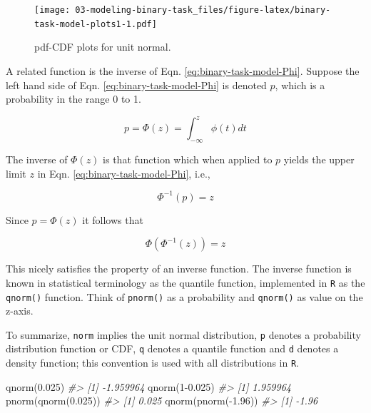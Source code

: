 \documentclass[
]{book}
\newenvironment{Shaded}{\begin{snugshade}}{\end{snugshade}}
\newcommand{\CommentTok}[1]{\textcolor[rgb]{0.56,0.35,0.01}{\textit{#1}}}
\newcommand{\DecValTok}[1]{\textcolor[rgb]{0.00,0.00,0.81}{#1}}
\newcommand{\FloatTok}[1]{\textcolor[rgb]{0.00,0.00,0.81}{#1}}
\newcommand{\FunctionTok}[1]{\textcolor[rgb]{0.00,0.00,0.00}{#1}}
\newcommand{\NormalTok}[1]{#1}
\newcommand{\SpecialCharTok}[1]{\textcolor[rgb]{0.00,0.00,0.00}{#1}}
\begin{document}
\begin{figure}
\centering
\texttt{[image: 03-modeling-binary-task\_files/figure-latex/binary-task-model-plots1-1.pdf]}
\caption{\label{fig:binary-task-model-plots1}pdf-CDF plots for unit normal.}
\end{figure}

A related function is the inverse of Eqn. \eqref{eq:binary-task-model-Phi}. Suppose the left hand side of Eqn. \eqref{eq:binary-task-model-Phi} is denoted \(p\), which is a probability in the range 0 to 1.

\begin{equation} 
p=\Phi\left ( z \right )=\int_{-\infty }^{z}\phi(t)dt
\label{eq:binary-task-model-Phi2}
\end{equation}

The inverse of \(\Phi(z)\) is that function which when applied to \(p\) yields the upper limit \(z\) in Eqn. \eqref{eq:binary-task-model-Phi}, i.e.,

\begin{equation} 
\Phi^{-1}(p) = z
\label{eq:binary-task-model-PhiInvDef}
\end{equation}

Since \(p=\Phi(z)\) it follows that

\begin{equation} 
\Phi(\Phi^{-1}(z))=z
\label{eq:binary-task-model-PhiInvDef2}
\end{equation}

This nicely satisfies the property of an inverse function. The inverse function is known in statistical terminology as the quantile function, implemented in \texttt{R} as the \texttt{qnorm()} function. Think of \texttt{pnorm()} as a probability and \texttt{qnorm()} as value on the z-axis.

To summarize, \texttt{norm} implies the unit normal distribution, \texttt{p} denotes a probability distribution function or CDF, \texttt{q} denotes a quantile function and \texttt{d} denotes a density function; this convention is used with all distributions in \texttt{R}.

\begin{Shaded}
\begin{Highlighting}[]
\FunctionTok{qnorm}\NormalTok{(}\FloatTok{0.025}\NormalTok{)}
\CommentTok{\#\textgreater{} [1] {-}1.959964}
\FunctionTok{qnorm}\NormalTok{(}\DecValTok{1}\FloatTok{{-}0.025}\NormalTok{)}
\CommentTok{\#\textgreater{} [1] 1.959964}
\FunctionTok{pnorm}\NormalTok{(}\FunctionTok{qnorm}\NormalTok{(}\FloatTok{0.025}\NormalTok{))}
\CommentTok{\#\textgreater{} [1] 0.025}
\FunctionTok{qnorm}\NormalTok{(}\FunctionTok{pnorm}\NormalTok{(}\SpecialCharTok{{-}}\FloatTok{1.96}\NormalTok{))}
\CommentTok{\#\textgreater{} [1] {-}1.96}
\end{Highlighting}
\end{Shaded}
\end{document}
